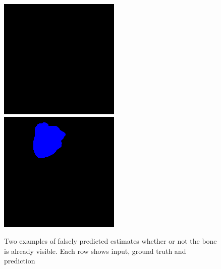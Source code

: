 \begin{figure}[H]
\endminipage\hfill
{}
  \includegraphics[width=\linewidth]{imgs/b7.png}
\endminipage\hfill
{}%
  \includegraphics[width=\linewidth]{imgs/c7.png}
\endminipage
\caption{Two examples of falsely predicted estimates whether or not the bone is already visible. Each row shows input, ground truth and prediction}
\end{figure}

